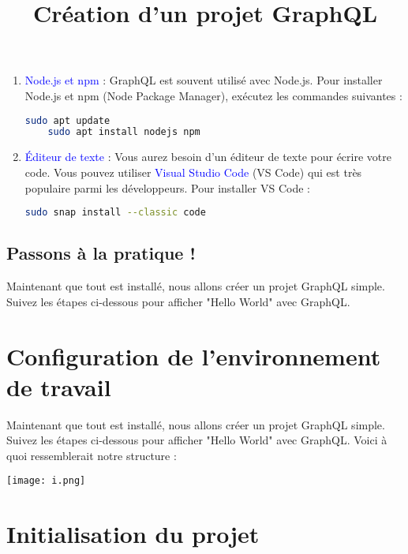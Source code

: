 \documentclass{article}
\begin{document}
\begin{enumerate}
    \item \textcolor{blue}{Node.js et npm} : GraphQL est souvent utilisé avec Node.js. Pour installer Node.js et npm (Node Package Manager), exécutez les commandes suivantes :
    \begin{lstlisting}[language=bash ,style=custombash]
    sudo apt update
    sudo apt install nodejs npm
    \end{lstlisting}

    \item \textcolor{blue}{Éditeur de texte} : Vous aurez besoin d'un éditeur de texte pour écrire votre code. Vous pouvez utiliser \textcolor{blue}{Visual Studio Code} (VS Code) qui est très populaire parmi les développeurs. Pour installer VS Code :
    \begin{lstlisting}[language=bash,style=custombash]
    sudo snap install --classic code
    \end{lstlisting}
\end{enumerate}

\subsection{Passons à la pratique ! \faRocket}
Maintenant que tout est installé, nous allons créer un projet GraphQL simple. Suivez les étapes ci-dessous pour afficher "Hello World" avec GraphQL.
\title{Création d'un projet GraphQL}
\author{}
\date{}
\maketitle

\section{Configuration de l'environnement de travail}
Maintenant que tout est installé, nous allons créer un projet GraphQL simple. Suivez les étapes ci-dessous pour afficher "Hello World" avec GraphQL. Voici à quoi ressemblerait notre structure :

\begin{center}
\texttt{[image: i.png]}
\end{center}

\section{Initialisation du projet}
\end{document}
